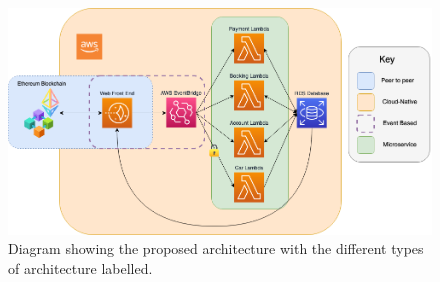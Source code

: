   \begin{figure}[H]
    \centering
    \includegraphics[width=12cm]{assets/architectureSectionedEvents.drawio.png}
    \caption{Diagram showing the proposed architecture with the different types of architecture labelled.}
    \label{fig:architectureSectioned}
  \end{figure}


